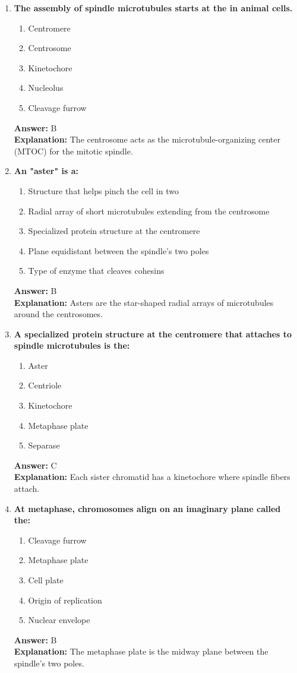 \documentclass[11pt, a4paper]{article}
\begin{document}
\begin{enumerate}[leftmargin=*, label=\arabic*.]
\item \textbf{The assembly of spindle microtubules starts at the \underline{\hspace{1cm}} in animal cells.}
\begin{enumerate}[label=\Alph*.]
\item Centromere
\item Centrosome
\item Kinetochore
\item Nucleolus
\item Cleavage furrow
\end{enumerate}
\textbf{Answer:} B \\
\textbf{Explanation:} The centrosome acts as the microtubule-organizing center (MTOC) for the mitotic spindle.

\item \textbf{An "aster" is a:}
\begin{enumerate}[label=\Alph*.]
\item Structure that helps pinch the cell in two
\item Radial array of short microtubules extending from the centrosome
\item Specialized protein structure at the centromere
\item Plane equidistant between the spindle's two poles
\item Type of enzyme that cleaves cohesins
\end{enumerate}
\textbf{Answer:} B \\
\textbf{Explanation:} Asters are the star-shaped radial arrays of microtubules around the centrosomes.

\item \textbf{A specialized protein structure at the centromere that attaches to spindle microtubules is the:}
\begin{enumerate}[label=\Alph*.]
\item Aster
\item Centriole
\item Kinetochore
\item Metaphase plate
\item Separase
\end{enumerate}
\textbf{Answer:} C \\
\textbf{Explanation:} Each sister chromatid has a kinetochore where spindle fibers attach.

\item \textbf{At metaphase, chromosomes align on an imaginary plane called the:}
\begin{enumerate}[label=\Alph*.]
\item Cleavage furrow
\item Metaphase plate
\item Cell plate
\item Origin of replication
\item Nuclear envelope
\end{enumerate}
\textbf{Answer:} B \\
\textbf{Explanation:} The metaphase plate is the midway plane between the spindle's two poles.


\end{enumerate}
\end{document}
